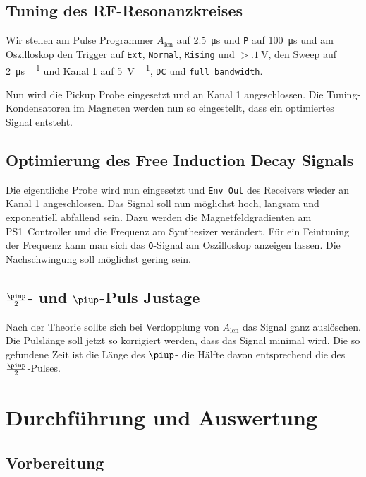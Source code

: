 \section{Tuning des RF-Resonanzkreises}

Wir stellen am Pulse Programmer $A_\text{len}$ auf \SI{2.5}{\micro\second} und
\texttt P auf \SI{100}{\micro\second} und am Oszilloskop den Trigger auf
\texttt{Ext}, \texttt{Normal}, \texttt{Rising} und $> \SI{.1}{\volt}$, den
Sweep auf \SI{2}{\micro\second\per\division} und Kanal 1 auf
\SI{5}{\volt\per\division}, \texttt{DC} und \texttt{full bandwidth}.

Nun wird die Pickup Probe eingesetzt und an Kanal 1 angeschlossen. Die
Tuning-Kondensatoren im Magneten werden nun so eingestellt, dass ein
optimiertes Signal entsteht.

\section{Optimierung des Free Induction Decay Signals}

Die eigentliche Probe wird nun eingesetzt und \texttt{Env Out} des Receivers
wieder an Kanal 1 angeschlossen. Das Signal soll nun möglichst hoch, langsam
und exponentiell abfallend sein. Dazu werden die Magnetfeldgradienten am
PS1~Controller und die Frequenz am Synthesizer verändert. Für ein Feintuning
der Frequenz kann man sich das \texttt{Q}-Signal am Oszilloskop anzeigen
lassen. Die Nachschwingung soll möglichst gering sein.

\section{$\frac\piup2$- und $\piup$-Puls Justage}

Nach der Theorie sollte sich bei Verdopplung von $A_\text{len}$ das Signal
ganz auslöschen. Die Pulslänge soll jetzt so korrigiert werden, dass das
Signal minimal wird. Die so gefundene Zeit ist die Länge des $\piup$- die
Hälfte davon entsprechend die des $\frac{\piup}{2}$-Pulses.

\chapter{Durchführung und Auswertung}

\section{Vorbereitung}

